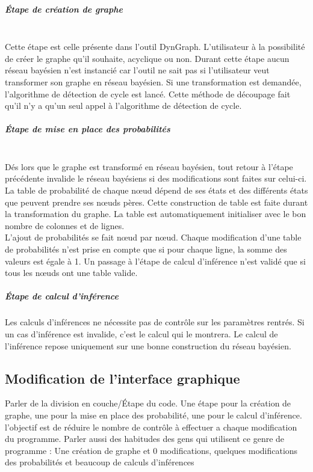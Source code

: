 \documentclass[conference]{IEEEtran}
\begin{document}
\subparagraph{Étape de création de graphe \hfill} \\
Cette étape est celle présente dans l'outil DynGraph. L'utilisateur à la possibilité de créer le graphe qu'il souhaite, acyclique ou non. Durant cette étape aucun réseau bayésien n'est instancié car  l'outil ne sait pas si l'utilisateur veut transformer son graphe en réseau bayésien. Si une transformation est demandée, l'algorithme de détection de cycle est lancé. Cette méthode de découpage fait qu'il n'y a qu'un seul appel à l'algorithme de détection de cycle. \\

\subparagraph{Étape de mise en place des probabilités \hfill}
\\
Dés lors que le graphe est transformé en réseau bayésien, tout retour à l'étape précédente invalide le réseau bayésiens si des modifications sont faites sur celui-ci. La table de probabilité de chaque nœud dépend de ses états et des différents états que peuvent prendre ses nœuds pères. Cette construction de table est faite durant la transformation du graphe. La table est automatiquement initialiser avec le bon nombre de colonnes et de lignes. \\
L'ajout de probabilités se fait nœud par nœud. Chaque modification d'une table de probabilités n'est prise en compte que si pour chaque ligne, la somme des valeurs est égale à 1. 
Un passage à l'étape de calcul d'inférence n'est validé que si tous les nœuds ont une table valide. \\

\subparagraph{Étape de calcul d'inférence}
Les calculs d'inférences ne nécessite pas de contrôle sur les paramètres rentrés. Si un cas d'inférence est invalide, c'est le calcul qui le montrera. Le calcul de l'inférence repose uniquement sur une bonne construction du réseau bayésien. 

\subsection{Modification de l'interface graphique }

Parler de la division en couche/Étape du code. Une étape pour la création de graphe, une pour la mise en place des probabilité, une pour le calcul d'inférence. l'objectif est de réduire le nombre de contrôle à effectuer a chaque modification du programme. Parler aussi des habitudes des gens qui utilisent ce genre de programme : Une création de graphe et 0 modifications, quelques modifications des probabilités et beaucoup de calculs d'inférences
\end{document}
